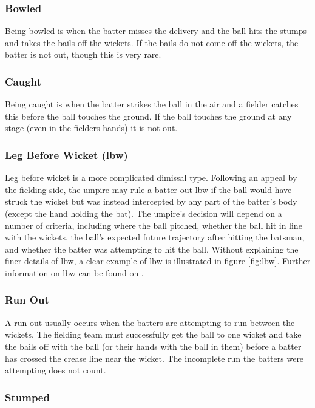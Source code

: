 \documentclass[12pt,a4paper]{report}
\theoremstyle{definition}
\begin{document}
\subsubsection{Bowled}

Being bowled is when the batter misses the delivery and the ball hits the stumps and takes the bails off the wickets.
If the bails do not come off the wickets, the batter is not out, though this is very rare.

\subsubsection{Caught}

Being caught is when the batter strikes the ball in the air and a fielder catches this before the ball touches the ground.
If the ball touches the ground at any stage (even in the fielders hands) it is not out.

\subsubsection{Leg Before Wicket (lbw)}

Leg before wicket is a more complicated dimissal type.
Following an appeal by the fielding side, the umpire may rule a batter out lbw if the ball would have struck the wicket but was instead intercepted by any part of the batter's body (except the hand holding the bat). 
The umpire's decision will depend on a number of criteria, including where the ball pitched, whether the ball hit in line with the wickets, the ball's expected future trajectory after hitting the batsman, and whether the batter was attempting to hit the ball.
Without explaining the finer details of lbw, a clear example of lbw is illustrated in figure \ref{fig:lbw}. 
Further information on lbw can be found on \citet{lbwWiki}.

\subsubsection{Run Out}

A run out usually occurs when the batters are attempting to run between the wickets.
The fielding team must successfully get the ball to one wicket and take the bails off with the ball (or their hands with the ball in them) before a batter has crossed the crease line near the wicket. 
The incomplete run the batters were attempting does not count.

\subsubsection{Stumped}
\end{document}
